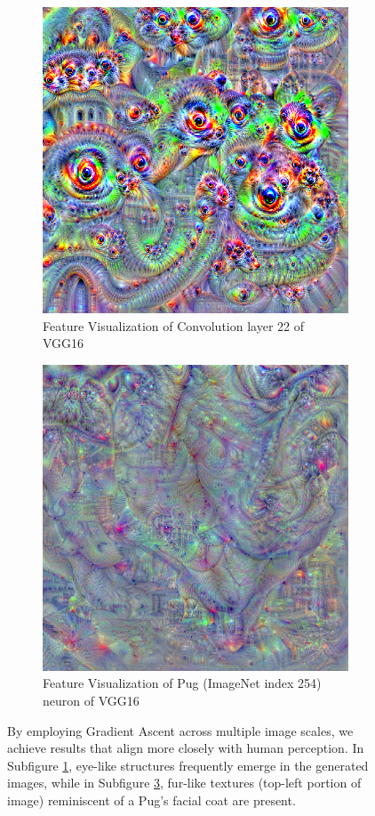 \begin{figure}
    \captionsetup{justification=centering}

    \begin{subfigure}[t]{0.45\textwidth}
        \captionsetup{justification=centering}
        \centering
        \includegraphics[width=.7\linewidth]{figuras/random_image_dream_pyramid.png}
        \caption{Feature Visualization of Convolution layer 22 of VGG16}
        \label{fig:feat_conv_L22_pyramid}
    \end{subfigure}
    \hfill
    \begin{subfigure}[t]{0.45\textwidth}
        \captionsetup{justification=centering}
        \centering
        \includegraphics[width=.7\linewidth]{figuras/random_image_dream_pyramid_class_254.png}
        \caption{Feature Visualization of Pug (ImageNet index 254) neuron of VGG16}
        \label{fig:feat_conv_I254_pyramid}
    \end{subfigure}

    \caption{By employing Gradient Ascent across multiple image scales, we achieve results that align more closely with human perception. In Subfigure \ref{fig:feat_conv_L22_pyramid}, eye-like structures frequently emerge in the generated images, while in Subfigure \ref{fig:feat_conv_I254_pyramid}, fur-like textures (top-left portion of image) reminiscent of a Pug's facial coat are present.}
\end{figure}

